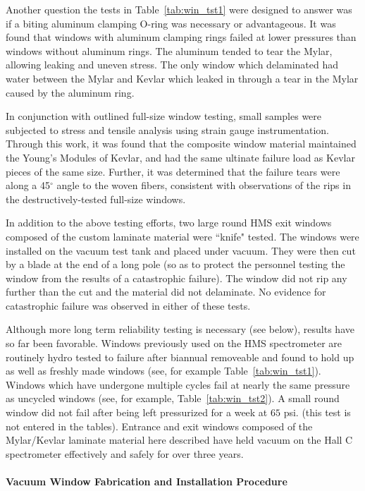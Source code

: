 {{Another question the tests in Table~\ref{tab:win_tst1} were designed to
answer was if
a biting aluminum clamping O-ring was necessary or advantageous. It was found
that windows with aluminum clamping rings failed at lower pressures than
windows without aluminum rings. The aluminum tended to tear the Mylar, allowing
leaking and uneven stress. The only window which delaminated had water between
the Mylar and Kevlar which leaked in through a tear in the
Mylar caused by the aluminum ring.

In conjunction with outlined full-size window testing, small samples
were subjected to stress and tensile analysis using strain gauge
instrumentation.  Through this work, it was found that the composite
window material maintained the Young's Modules of Kevlar, and had the
same ultinate failure load as Kevlar pieces of the same size.
Further, it was determined that the failure tears were along a
45$^{\circ}$ angle to the woven fibers, consistent with observations
of the rips in the destructively-tested full-size windows.  

In addition to the above testing efforts, two large round HMS exit windows
composed of the custom laminate material were ``knife" tested. The windows
were installed on the vacuum test tank and placed under vacuum. They were then
cut by a blade at the end of a long pole (so as to protect the personnel
testing the window from the results of a catastrophic failure). The window
did not rip any further than the cut and the
material did not delaminate. No evidence for catastrophic failure
was observed in either of these tests.

Although more long term reliability testing is necessary (see below),
results have so far been favorable.
Windows previously used on the HMS spectrometer are routinely hydro
tested to failure after biannual removeable and found to
hold up as well as freshly made windows (see, for example
Table~\ref{tab:win_tst1}).  Windows which have undergone multiple cycles fail at nearly the same pressure as uncycled
windows (see, for example, Table~\ref{tab:win_tst2}). A small round window did not fail after
being left pressurized for
a week at $65$ psi. (this test is not entered in the tables).
Entrance and exit windows composed of the Mylar/Kevlar laminate
material here described have held vacuum on the Hall C
spectrometer effectively and safely for over three years.


\paragraph{Vacuum Window Fabrication and Installation Procedure}

}}
